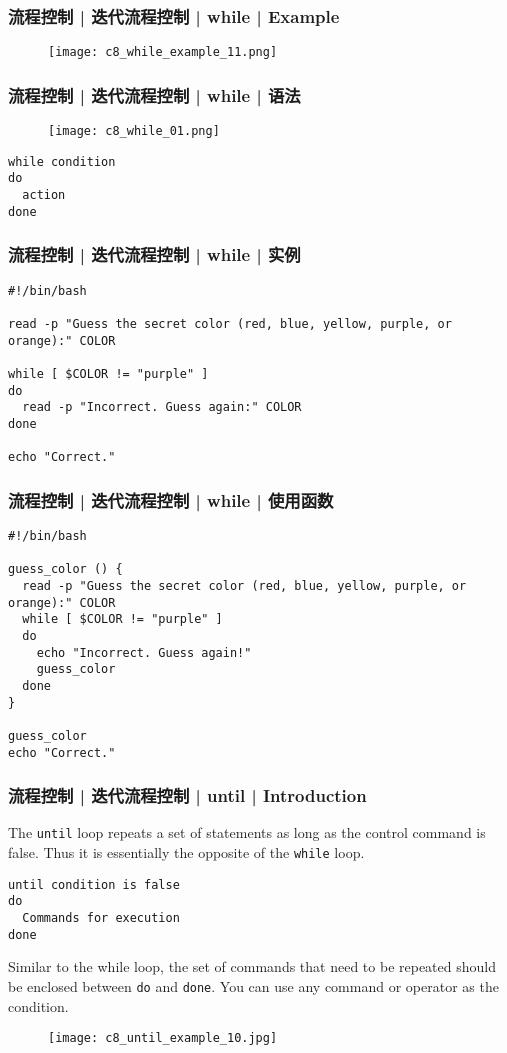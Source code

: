 \begin{frame}
  \frametitle{流程控制 | 迭代流程控制 | while | Example}
  \begin{figure}
    \centering
    \texttt{[image: c8\_while\_example\_11.png]}
  \end{figure}
\end{frame}

\begin{frame}[fragile]
  \frametitle{流程控制 | 迭代流程控制 | while | \alert{语法}}
  \begin{figure}
    \centering
    \texttt{[image: c8\_while\_01.png]}
  \end{figure}
\begin{lstlisting}
while condition
do
  action
done
\end{lstlisting}
\end{frame}

\begin{frame}[fragile]
  \frametitle{流程控制 | 迭代流程控制 | while | \alert{实例}}
\begin{lstlisting}
#!/bin/bash

read -p "Guess the secret color (red, blue, yellow, purple, or orange):" COLOR

while [ $COLOR != "purple" ]
do
  read -p "Incorrect. Guess again:" COLOR
done

echo "Correct."
\end{lstlisting}
\end{frame}

\begin{frame}[fragile]
  \frametitle{流程控制 | 迭代流程控制 | while | 使用函数}
\begin{lstlisting}
#!/bin/bash

guess_color () {
  read -p "Guess the secret color (red, blue, yellow, purple, or orange):" COLOR
  while [ $COLOR != "purple" ]
  do
    echo "Incorrect. Guess again!"
    guess_color
  done
}

guess_color
echo "Correct."
\end{lstlisting}
\end{frame}

\begin{frame}[fragile]
  \frametitle{流程控制 | 迭代流程控制 | until | Introduction}
  The \verb|until| loop repeats a set of statements as long as the control command is false. Thus it is essentially the opposite of the \verb|while| loop.\\
  \vspace{-0.2cm}
\begin{lstlisting}
until condition is false
do
  Commands for execution
done
\end{lstlisting}
  \vspace{-0.1cm}
  Similar to the while loop, the set of commands that need to be repeated should be enclosed between \verb|do| and \verb|done|. You can use any command or operator as the condition.\\
  \vspace{-0.2cm}
  \begin{figure}
    \centering
    \texttt{[image: c8\_until\_example\_10.jpg]}
  \end{figure}
\end{frame}

